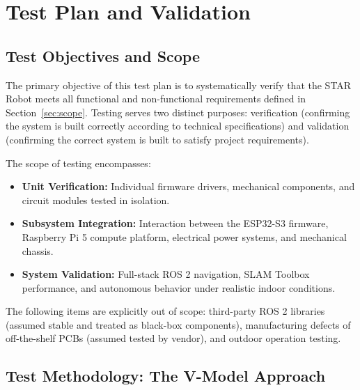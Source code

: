 
\section{Test Plan and Validation}
\label{sec:test_plan}

\subsection{Test Objectives and Scope}

The primary objective of this test plan is to systematically verify that the STAR Robot meets all functional and non-functional requirements defined in Section~\ref{sec:scope}. Testing serves two distinct purposes: verification (confirming the system is built correctly according to technical specifications) and validation (confirming the correct system is built to satisfy project requirements).

The scope of testing encompasses:

\begin{itemize}
    \item \textbf{Unit Verification:} Individual firmware drivers, mechanical components, and circuit modules tested in isolation.
    \item \textbf{Subsystem Integration:} Interaction between the ESP32-S3 firmware, Raspberry Pi 5 compute platform, electrical power systems, and mechanical chassis.
    \item \textbf{System Validation:} Full-stack ROS 2 navigation, SLAM Toolbox performance, and autonomous behavior under realistic indoor conditions.
\end{itemize}

The following items are explicitly out of scope: third-party ROS 2 libraries (assumed stable and treated as black-box components), manufacturing defects of off-the-shelf PCBs (assumed tested by vendor), and outdoor operation testing.

\subsection{Test Methodology: The V-Model Approach}

